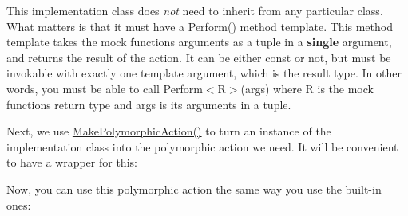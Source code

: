 This implementation class does {\itshape not} need to inherit from any particular class. What matters is that it must have a {\ttfamily Perform()} method template. This method template takes the mock function\textquotesingle{}s arguments as a tuple in a {\bfseries{single}} argument, and returns the result of the action. It can be either {\ttfamily const} or not, but must be invokable with exactly one template argument, which is the result type. In other words, you must be able to call {\ttfamily Perform$<$R$>$(args)} where {\ttfamily R} is the mock function\textquotesingle{}s return type and {\ttfamily args} is its arguments in a tuple.

Next, we use {\ttfamily \mbox{\hyperlink{namespacetesting_a45df529b8166936d970884383f0ede82}{Make\+Polymorphic\+Action()}}} to turn an instance of the implementation class into the polymorphic action we need. It will be convenient to have a wrapper for this\+:


\begin{DoxyCode}{0}
\DoxyCodeLine{}
\DoxyCodeLine{\}}
\end{DoxyCode}


Now, you can use this polymorphic action the same way you use the built-\/in ones\+:


